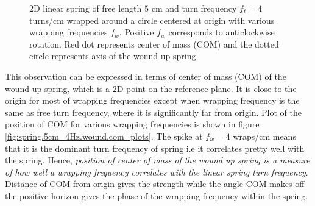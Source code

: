\documentclass[11pt, a4paper]{article}
\begin{document}
\begin{figure}[H]
{
		}\hfill
		\hfill
		
		\caption{2D linear spring of free length $5$ cm and turn frequency $f_{t} = 4$ turns/cm wrapped around a circle centered at origin with various wrapping frequencies $f_{w}$. Positive $f_{w}$ corresponds to anticlockwise rotation. Red dot represents center of mass (COM) and the dotted circle represents axis of the wound up spring}
		\label{fig:spring.5cm_4Hz.wound_plots}
	\end{figure}

	This observation can be expressed in terms of center of mass (COM) of the wound up spring, which is a 2D point on the reference plane. It is close to the origin for most of wrapping frequencies except when wrapping frequency is the same as free turn frequency, where it is significantly far from origin. Plot of the position of COM for various wrapping frequencies is shown in figure \ref{fig:spring.5cm_4Hz.wound.com_plots}. The spike at $f_{w} = 4$ wraps/cm means that it is the dominant turn frequency of spring i.e it correlates pretty well with the spring. Hence, \textit{position of center of mass of the wound up spring is a measure of how well a wrapping frequency correlates with the linear spring turn frequency}. Distance of COM from origin gives the strength while the angle COM makes off the positive horizon gives the phase of the wrapping frequency within the spring.
	
\end{document}
